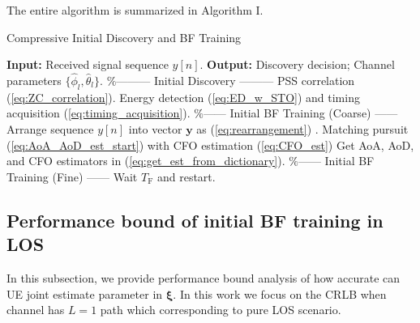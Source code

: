 \documentclass[journal]{IEEEtran}
\newcommand{\TSS}[0]{T_{\text{F}}}
\newcommand{\Gr}[0]{G_{\text{R}}}
\newcommand{\Gt}[0]{G_{\text{T}}}
\newcommand{\Gd}[0]{G_{\text{D}}}
\begin{document}
The entire algorithm is summarized in Algorithm I.
\begin{algorithm}
\caption{Compressive Initial Discovery and BF Training}
\begin{algorithmic}[1]
\Statex \textbf{Input:} Received signal sequence $y[n]$.
\Statex \textbf{Output:} Discovery decision; Channel parameters $\{\hat{\phi}_{l}, \hat{\theta}_{l}\}$.
  \Statex $\mathrm{\%}$\quad\quad\quad--------- \quad  Initial Discovery \quad ---------\quad\quad
  \State PSS correlation (\ref{eq:ZC_correlation}).
  \State Energy detection (\ref{eq:ED_w_STO}) and timing acquisition (\ref{eq:timing_acquisition}).
  \Statex $\mathrm{\%}$\quad\quad\quad------ \quad  Initial BF Training (Coarse) \quad ------\quad\quad
  \State Arrange sequence $y[n]$ into vector $\mathbf{y}$ as (\ref{eq:rearrangement})
  .
  \State Matching pursuit (\ref{eq:AoA_AoD_est_start}) with CFO estimation (\ref{eq:CFO_est})
  \State Get AoA, AoD, and CFO estimators in (\ref{eq:get_est_from_dictionary}).
  \Statex $\mathrm{\%}$\quad\quad------ \quad  Initial BF Training (Fine) \quad ------\quad
  \EndWhile\label{euclidendwhile}
  \Else 
  \State Wait $\TSS$ and restart.
  \EndIf
\end{algorithmic}
\end{algorithm}


% 
%
\subsection{Performance bound of initial BF training in LOS}
In this subsection, we provide performance bound analysis of how accurate can UE joint estimate parameter in $\boldsymbol{\xi}$. In this work we focus on the CRLB when channel has $L=1$ path which corresponding to pure LOS scenario.
\end{document}
